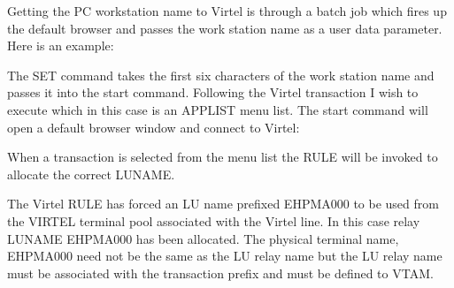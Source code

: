 \documentclass[letterpaper,10pt,english]{sphinxmanual}
\begin{document}
\sphinxAtStartPar
Getting the PC workstation name to Virtel is through a batch job which fires up the default browser and passes the work station name as a user
data parameter. Here is an example:\sphinxhyphen{}

\begin{sphinxVerbatim}[commandchars=\\\{\}]
     
 
 
 
  
\end{sphinxVerbatim}

\sphinxAtStartPar
The SET command takes the first six characters of the work station name and passes it into the start command. Following the Virtel transaction I wish to execute which in this case is an APPLIST menu list. The start command will open a default browser window and connect to Virtel:\sphinxhyphen{}

\sphinxAtStartPar
{}

\sphinxAtStartPar
{}

\sphinxAtStartPar
When a transaction is selected from the menu list the RULE will be invoked to allocate the correct LUNAME.

\sphinxAtStartPar
{}

\sphinxAtStartPar
{}

\sphinxAtStartPar
The Virtel RULE has forced an LU name prefixed EHPMA000 to be used from the VIRTEL terminal pool associated with the Virtel line. In this case relay LUNAME EHPMA000 has been allocated. The physical terminal name, EHPMA000 need not be the same as the LU relay name but the LU relay name must be associated with the transaction prefix and must be defined to VTAM.
\end{document}
